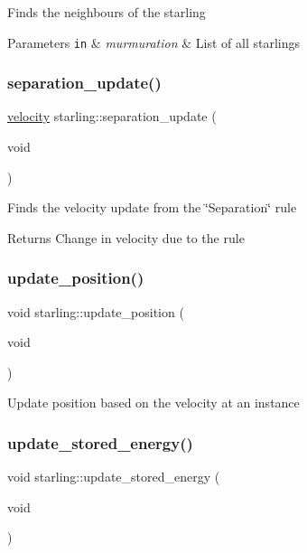 Finds the neighbours of the starling 
\begin{DoxyParams}[1]{Parameters}
\mbox{\tt in}  & {\em murmuration} & List of all starlings \\
\hline
\end{DoxyParams}
\mbox{\label{classstarling_add23addc4c4ef3e24765f5200b08adca}} 
\subsubsection{\texorpdfstring{separation\+\_\+update()}{separation\_update()}}
{\footnotesize\ttfamily \mbox{\hyperlink{classvelocity}{velocity}} starling\+::separation\+\_\+update (\begin{DoxyParamCaption}\item[{void}]{ }\end{DoxyParamCaption})}

Finds the velocity update from the \char`\"{}\+Separation\char`\"{} rule \begin{DoxyReturn}{Returns}
Change in velocity due to the rule 
\end{DoxyReturn}
\mbox{\label{classstarling_a5fa9e4fa8154e1b81adb29573954ec15}} 
\subsubsection{\texorpdfstring{update\+\_\+position()}{update\_position()}}
{\footnotesize\ttfamily void starling\+::update\+\_\+position (\begin{DoxyParamCaption}\item[{void}]{ }\end{DoxyParamCaption})}

Update position based on the velocity at an instance \mbox{\label{classstarling_a1d8f70aad997f935444426243d3ed20a}} 
\subsubsection{\texorpdfstring{update\+\_\+stored\+\_\+energy()}{update\_stored\_energy()}}
{\footnotesize\ttfamily void starling\+::update\+\_\+stored\+\_\+energy (\begin{DoxyParamCaption}\item[{void}]{ }\end{DoxyParamCaption})}

